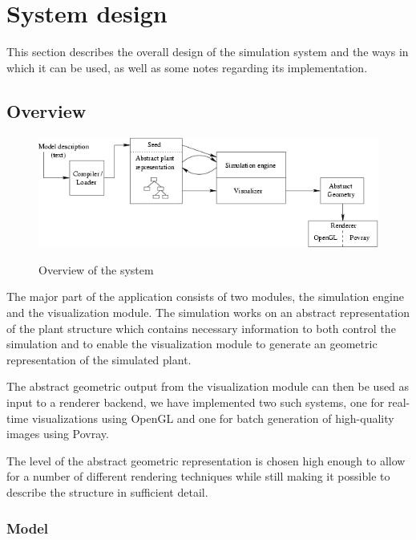



\section{System design}

    This section describes the overall design of the simulation system
    and the ways in which it can be used, as well as some notes
    regarding its implementation.


\subsection{Overview}

\begin{figure}[htb]
        \centering
        \includegraphics[width=12cm,angle=0]{images/system_overview}
        \label{fig:sys1}
    \caption{Overview of the system}
\end{figure}


    The major part of the application consists of two modules, the
    simulation engine and the visualization module. The simulation
    works on an abstract representation of the plant structure which
    contains necessary information to both control the simulation and
    to enable the visualization module to generate an geometric
    representation of the simulated plant. 

    The abstract geometric output from the visualization module can
    then be used as input to a renderer backend, we have implemented
    two such systems, one for real-time visualizations using OpenGL
    and one for batch generation of high-quality images using Povray.

    The level of the abstract geometric representation is chosen high
    enough to allow for a number of different rendering techniques
    while still making it possible to describe the structure in
    sufficient detail.


\subsubsection{Model}

